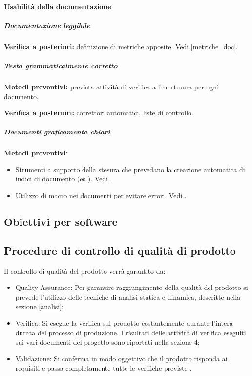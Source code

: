 \documentclass[12pt,a4paper]{article}
\begin{document}
\paragraph{Usabilità della documentazione}
\subparagraph{Documentazione leggibile}
\textbf{Verifica a posteriori:}  definizione di metriche apposite. Vedi \ref{metriche_doc}.



\subparagraph{Testo grammaticalmente corretto} 


\textbf{Metodi preventivi:} prevista attività di verifica a fine stesura per ogni documento.


\textbf{Verifica a posteriori:} correttori automatici, liste di controllo.
\subparagraph{Documenti graficamente chiari}

\textbf{Metodi preventivi:} 
\begin{itemize}
	\item Strumenti a supporto della stesura che prevedano la creazione automatica di indici di documento (es \latex). Vedi \NdP.
	\item Utilizzo di macro nei documenti per evitare errori. Vedi \NdP.
\end{itemize}


\subsection{Obiettivi per software}

\subsection{Procedure di controllo di qualità di prodotto}\label{sec:procedure-di-controllo-di-qualità-di-prodotto}
Il controllo di qualità del prodotto verrà garantito da:
\begin{itemize}
	\item Quality Assurance: Per garantire raggiungimento della qualità del prodotto  si  prevede l'utilizzo delle tecniche di analisi statica e dinamica, descritte nella sezione \ref{analisi};
	\item Verifica: Si esegue la verifica sul prodotto costantemente durante l'intera durata del processo di produzione. I risultati delle attività di verifica eseguiti sui vari documenti del progetto sono riportati nella sezione 4;
	\item Validazione: Si conferma in modo oggettivo che il prodotto risponda ai requisiti e passa completamente tutte le verifiche previste .
\end{itemize}
\end{document}
